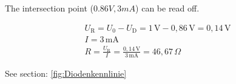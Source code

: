{\begin{itemize}
        The intersection point ($0.86 V, 3 mA$) can be read off.
    
        \begin{gather*}
            U_\mathrm{R} = U_0 - U_\mathrm{D} = 1 \, \mathrm{V} - 0,86 \, \mathrm{V} = 0,14 \, \mathrm{V} \\
            I = 3 \, \mathrm{mA} \\
            R = \frac{U_{\text{R}}}{I} = \frac{0,14 \, \text{V}}{3 \, \text{mA}} = 46,67 \, \Omega
        \end{gather*}
    \end{itemize}
See section: \ref{fig:Diodenkennlinie}









}
